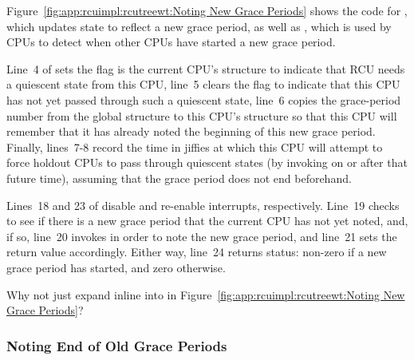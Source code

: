 Figure~\ref{fig:app:rcuimpl:rcutreewt:Noting New Grace Periods}
shows the code for , which updates state to reflect
a new grace period, as well as , which
is used by CPUs to detect when other CPUs have started a new grace period.

Line~4 of  sets the  flag is
the current CPU's  structure to indicate that RCU needs
a quiescent state from this CPU, line~5 clears the 
flag to indicate that this CPU has not yet passed through such a
quiescent state,
line~6 copies the grace-period number from the global 
structure to this CPU's  structure so that this CPU will
remember that it has already noted the beginning of this new grace
period.
Finally, lines~7-8 record the time in jiffies at which this CPU
will attempt to force holdout CPUs to pass through quiescent states
(by invoking  on or after that future time),
assuming that the grace period does not end beforehand.

Lines~18 and 23 of  disable and
re-enable interrupts, respectively.
Line~19 checks to see if there is a new grace period that the current
CPU has not yet noted, and, if so, line~20 invokes 
in order to note the new grace period, and line~21 sets the return value
accordingly.
Either way, line~24 returns status: non-zero if a new grace period has
started, and zero otherwise.

\QuickQuiz{}
	Why not just expand  inline into
	 in
	Figure~\ref{fig:app:rcuimpl:rcutreewt:Noting New Grace Periods}?
 \QuickQuizEnd

\subsubsection{Noting End of Old Grace Periods}
\label{app:rcuimpl:rcutreewt:Noting End of Old Grace Periods}

